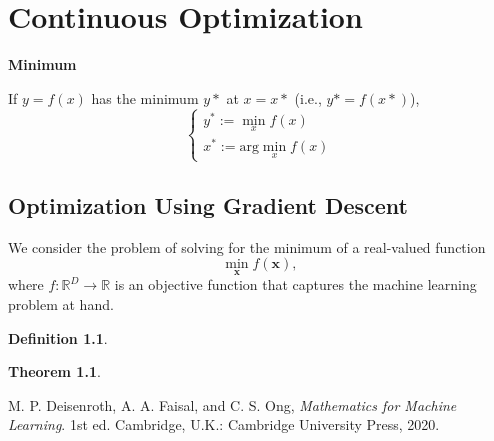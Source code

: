 \documentclass[12pt,openany]{book}
\newtheorem{theorem}{Theorem}[chapter]
\theoremstyle{definition}
\newtheorem{definition}{Definition}[chapter]
\newcommand{\R}{\mathbb{R}}
\newcommand{\ie}{\textnormal{i.e.}}
\newcommand{\mvec}[1]{\boldsymbol{#1}}
\renewcommand{\vec}[1]{\textbf{#1}}
\begin{document}
%	
%	
%	
	
	\newpage
	\chapter{Continuous Optimization}
	
	\textbf{Minimum}
	
	If $y=f(x)$ has the minimum $y*$ at $x=x*$ (\ie, $y*=f(x*)$), \[
	\begin{cases}
		y^*:=\min_x f(x)\\
		x^*:=\text{arg}\min_x f(x)
	\end{cases}
	\]
	\section{Optimization Using Gradient Descent}
	We consider the problem of solving for the minimum of a real-valued
	function \[
	\min_{\vec{x}}f(\vec{x}),
	\] where $f:\R^D\to\R$ is an objective function that captures the machine learning problem at hand.
	\begin{tcolorbox}[colframe=defcolor,title={\color{white}\bf }]
		\begin{definition}
			
		\end{definition}
	\end{tcolorbox}
	\begin{tcolorbox}[colframe=thmcolor,title={\color{white}\bf }]
		\begin{theorem}
			
		\end{theorem}
	\end{tcolorbox}

	\begin{thebibliography}{9}
		M. P. Deisenroth, A. A. Faisal, and C. S. Ong, \textit{Mathematics for Machine Learning}. 1st ed. Cambridge, U.K.: Cambridge University Press, 2020.
	\end{thebibliography}
\end{document}
